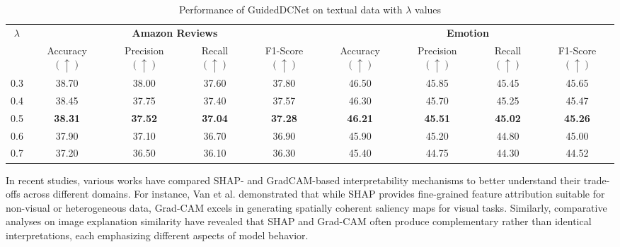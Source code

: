 \documentclass[a4paper,fleqn]{cas-sc}
\begin{document}
\begin{table}[htbp]
\centering
\caption{Performance of GuidedDCNet on textual data with $\lambda$ values}
\label{tab9}
\begin{tabular}{c|cccc|cccc}
\hline
\multirow{2}{*}{$\lambda$} 
& \multicolumn{4}{c|}{\textbf{Amazon Reviews}} 
& \multicolumn{4}{c}{\textbf{Emotion}} \\ 
\cline{2-9}
& \makecell{Accuracy \\ \((\uparrow)\)} & \makecell{Precision \\ \((\uparrow)\)} & \makecell{Recall \\ \((\uparrow)\)} & \makecell{F1-Score \\ \((\uparrow)\)}
& \makecell{Accuracy \\ \((\uparrow)\)} & \makecell{Precision \\ \((\uparrow)\)} & \makecell{Recall \\ \((\uparrow)\)} & \makecell{F1-Score \\ \((\uparrow)\)} \\ 
\hline
0.3 & 38.70 & 38.00 & 37.60 & 37.80 
    & 46.50 & 45.85 & 45.45 & 45.65 \\
0.4 & 38.45 & 37.75 & 37.40 & 37.57 
    & 46.30 & 45.70 & 45.25 & 45.47 \\
0.5 & \textbf{38.31} & \textbf{37.52} & \textbf{37.04} & \textbf{37.28} 
    & \textbf{46.21} & \textbf{45.51} & \textbf{45.02} & \textbf{45.26} \\
0.6 & 37.90 & 37.10 & 36.70 & 36.90 
    & 45.90 & 45.20 & 44.80 & 45.00 \\
0.7 & 37.20 & 36.50 & 36.10 & 36.30 
    & 45.40 & 44.75 & 44.30 & 44.52 \\
\hline
\end{tabular}
\end{table}

In recent studies, various works have compared SHAP- and GradCAM-based interpretability mechanisms to better understand their trade-offs across different domains. For instance, Van et al. \cite{van2024harnessing} demonstrated that while SHAP provides fine-grained feature attribution suitable for non-visual or heterogeneous data, Grad-CAM excels in generating spatially coherent saliency maps for visual tasks. Similarly, comparative analyses on image explanation similarity \cite{yavtukhovskyi2025evaluation} have revealed that SHAP and Grad-CAM often produce complementary rather than identical interpretations, each emphasizing different aspects of model behavior.
\end{document}
